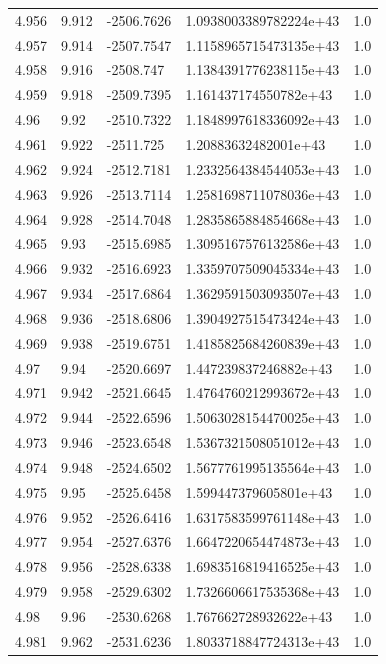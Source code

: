 \begin{tabular}{lllll}
4.956 & 9.912 & -2506.7626 & 1.0938003389782224e+43 & 1.0 \\
4.957 & 9.914 & -2507.7547 & 1.1158965715473135e+43 & 1.0 \\
4.958 & 9.916 & -2508.747 & 1.1384391776238115e+43 & 1.0 \\
4.959 & 9.918 & -2509.7395 & 1.161437174550782e+43 & 1.0 \\
4.96 & 9.92 & -2510.7322 & 1.1848997618336092e+43 & 1.0 \\
4.961 & 9.922 & -2511.725 & 1.20883632482001e+43 & 1.0 \\
4.962 & 9.924 & -2512.7181 & 1.2332564384544053e+43 & 1.0 \\
4.963 & 9.926 & -2513.7114 & 1.2581698711078036e+43 & 1.0 \\
4.964 & 9.928 & -2514.7048 & 1.2835865884854668e+43 & 1.0 \\
4.965 & 9.93 & -2515.6985 & 1.3095167576132586e+43 & 1.0 \\
4.966 & 9.932 & -2516.6923 & 1.3359707509045334e+43 & 1.0 \\
4.967 & 9.934 & -2517.6864 & 1.3629591503093507e+43 & 1.0 \\
4.968 & 9.936 & -2518.6806 & 1.3904927515473424e+43 & 1.0 \\
4.969 & 9.938 & -2519.6751 & 1.4185825684260839e+43 & 1.0 \\
4.97 & 9.94 & -2520.6697 & 1.447239837246882e+43 & 1.0 \\
4.971 & 9.942 & -2521.6645 & 1.4764760212993672e+43 & 1.0 \\
4.972 & 9.944 & -2522.6596 & 1.5063028154470025e+43 & 1.0 \\
4.973 & 9.946 & -2523.6548 & 1.5367321508051012e+43 & 1.0 \\
4.974 & 9.948 & -2524.6502 & 1.5677761995135564e+43 & 1.0 \\
4.975 & 9.95 & -2525.6458 & 1.599447379605801e+43 & 1.0 \\
4.976 & 9.952 & -2526.6416 & 1.6317583599761148e+43 & 1.0 \\
4.977 & 9.954 & -2527.6376 & 1.6647220654474873e+43 & 1.0 \\
4.978 & 9.956 & -2528.6338 & 1.6983516819416525e+43 & 1.0 \\
4.979 & 9.958 & -2529.6302 & 1.7326606617535368e+43 & 1.0 \\
4.98 & 9.96 & -2530.6268 & 1.767662728932622e+43 & 1.0 \\
4.981 & 9.962 & -2531.6236 & 1.8033718847724313e+43 & 1.0 \\

\end{tabular}
